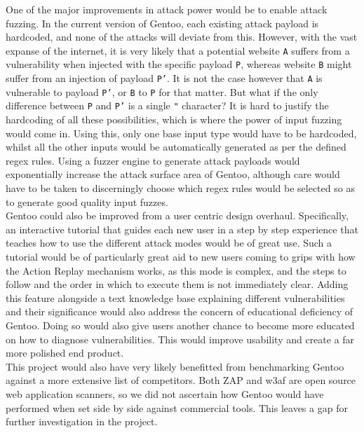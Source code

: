 One of the major improvements in attack power would be to enable attack fuzzing. In the current version of Gentoo, each existing attack payload is hardcoded, and none of the attacks will deviate from this. However, with the vast expanse of the internet, it is very likely that a potential website \texttt{A} suffers from a vulnerability when injected with the specific payload \texttt{P}, whereas website \texttt{B} might suffer from an injection of payload \texttt{P'}. It is not the case however that \texttt{A} is vulnerable to payload \texttt{P'}, or \texttt{B} to \texttt{P}
 for that matter. But what if the only difference between \texttt{P} and \texttt{P'} is a single \texttt{"} character? It is hard to justify the hardcoding of all these possibilities, which is where the power of input fuzzing would come in. Using this, only one base input type would have to be hardcoded, whilst all the other inputs would be automatically generated as per the defined regex rules. Using a fuzzer engine to generate attack payloads would exponentially increase the attack surface area of Gentoo, although care would have to be taken to discerningly choose which regex rules would be selected so as to generate good quality input fuzzes. \\
 
 Gentoo could also be improved from a user centric design overhaul. Specifically, an interactive tutorial that guides each new user in a step by step experience that teaches how to use the different attack modes would be of great use. Such a tutorial would be of particularly great aid to new users coming to grips with how the Action Replay mechanism works, as this mode is complex, and the steps to follow and the order in which to execute them is not immediately clear. Adding this feature alongside a text knowledge base explaining different vulnerabilities and their significance would also address the concern of educational deficiency of Gentoo.  Doing so would also give users another chance to become more educated on how to diagnose vulnerabilities. This would improve usability and create a far more polished end product. \\
 
 This project would also have very likely benefitted from benchmarking Gentoo against a more extensive list of competitors. Both ZAP and w3af are open source web application scanners, so we did not ascertain how Gentoo would have performed when set side by side against commercial tools. This leaves a gap for further investigation in the project. \\



